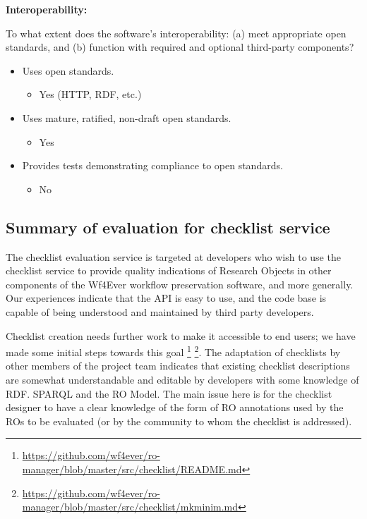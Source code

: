 \textbf{Interoperability:}

To what extent does the software's interoperability: (a) meet
appropriate open standards, and (b) function with required and optional
third-party components?

\begin{itemize}
\itemsep1pt\parskip0pt
\item
  Uses open standards.

  \begin{itemize}
  \itemsep1pt\parskip0pt
  \item
    Yes (HTTP, RDF, etc.)
  \end{itemize}
\item
  Uses mature, ratified, non-draft open standards.

  \begin{itemize}
  \itemsep1pt\parskip0pt
  \item
    Yes
  \end{itemize}
\item
  Provides tests demonstrating compliance to open standards.

  \begin{itemize}
  \itemsep1pt\parskip0pt
  \item
    No
  \end{itemize}
\end{itemize}

\subsection{Summary of evaluation for checklist service}

The checklist evaluation service is targeted at developers who wish to
use the checklist service to provide quality indications of Research
Objects in other components of the Wf4Ever workflow preservation
software, and more generally. Our experiences indicate that the API is
easy to use, and the code base is capable of being understood and
maintained by third party developers.

Checklist creation needs further work to make it accessible to end
users; we have made some initial steps towards this goal \footnote{\url{https://github.com/wf4ever/ro-manager/blob/master/src/checklist/README.md}}
\footnote{\url{https://github.com/wf4ever/ro-manager/blob/master/src/checklist/mkminim.md}}.
The adaptation of checklists by other members of the project team
indicates that existing checklist descriptions are somewhat
understandable and editable by developers with some knowledge of RDF.
SPARQL and the RO Model. The main issue here is for the checklist
designer to have a clear knowledge of the form of RO annotations used by
the ROs to be evaluated (or by the community to whom the checklist is
addressed).

